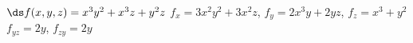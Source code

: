 {$\ds f(x,y,z) = x^3y^2+x^3z+y^2z$}
{$f_x = 3x^2y^2+3x^2z$, $f_y = 2x^3y+2yz$, $f_z = x^3+y^2$\\
$f_{yz} = 2y$, $f_{zy} = 2y$
}